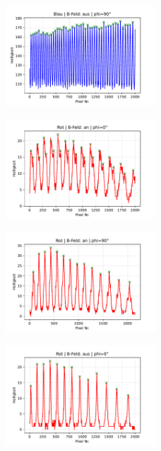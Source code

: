       \begin{figure}
        \centering
        \includegraphics[width=0.5\textwidth]{content/grafiken/blau ohne magnet 90 gimbplot.pdf}
        \caption{}
        \label{fig:bom90}
      \end{figure}
      
      \begin{figure}
        \centering
        \includegraphics[width=0.5\textwidth]{content/grafiken/rot mit magnet 0 gimbplot.pdf}
        \caption{}
        \label{fig:rmm0}
      \end{figure}
      
      \begin{figure}
        \centering
        \includegraphics[width=0.5\textwidth]{content/grafiken/rot mit magnet 90 gimbplot.pdf}
        \caption{}
        \label{fig:rmm90}
      \end{figure}
      
      \begin{figure}
        \centering
        \includegraphics[width=0.5\textwidth]{content/grafiken/rot ohne magnet 0 gimbplot.pdf}
        \caption{}
        \label{fig:rom0}
      \end{figure}
      
